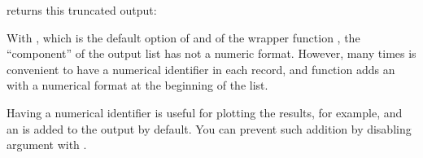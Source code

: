 \documentclass[a4paper,12pt,english]{sphinxhowto}
\begin{document}
returns this truncated output:

\begin{sphinxVerbatim}[commandchars=\\\{\},formatcom=\footnotesize]
\PYG{c+c1}{\PYGZsh{}[1] \PYGZdq{}[ ] / [ ] / [ ] / GER PO[ ]TIF / [ ] / [ ] / [ ] / [\PYGZdq{}}
\end{sphinxVerbatim}

With , which is the default option of  and of the wrapper
function , the  “component” of the output list has not a numeric
format. However, many times is convenient to have a numerical identifier in each record,
and function  adds an  with a numerical format at the beginning of the list.

Having a numerical identifier is useful for plotting the results, for example, and an  is added
to the output by default. You can prevent such addition by disabling
argument  with .

\begin{sphinxVerbatim}[commandchars=\\\{\},formatcom=\footnotesize]
  
\end{sphinxVerbatim}
\end{document}
